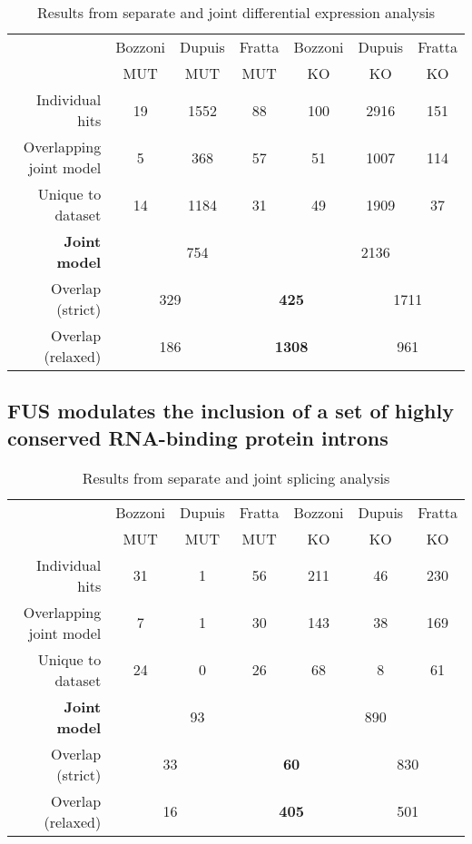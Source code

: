 \begin{table}[h!]
		\begin{tabular}{|r|ccc|ccc|}
			\hline
			& Bozzoni & Dupuis & Fratta & Bozzoni & Dupuis & Fratta\\
			& MUT & MUT & MUT & KO & KO & KO\\
			\hline
			Individual hits                & 19 & 1552 & 88 & 100 & 2916 & 151 \\
			Overlapping joint model & 5 & 368 & 57 & 51 & 1007 & 114 \\
			Unique to dataset          & 14 & 1184 & 31 & 49 & 1909 & 37 \\
			\hline
			\textbf{Joint model}       & \multicolumn{3}{c|}{754} & \multicolumn{3}{c|}{2136} \\
			\hline
			Overlap (strict)              & \multicolumn{2}{c}{329} & \multicolumn{2}{|c|}{\textbf{425}} & \multicolumn{2}{c|}{1711} \\
			Overlap (relaxed)           & \multicolumn{2}{c}{186} & \multicolumn{2}{|c|}{\textbf{1308} } & \multicolumn{2}{c|}{961} \\
			\hline
		\end{tabular}
	\caption{Results from separate and joint differential expression analysis}
	\label{tab:expression_results}
\end{table}




\subsection{FUS modulates the inclusion of a set of highly conserved RNA-binding protein introns}

\begin{table}[h!]
		\begin{tabular}{|r|ccc|ccc|}
			\hline
			& Bozzoni & Dupuis & Fratta & Bozzoni & Dupuis & Fratta\\
			& MUT & MUT & MUT & KO & KO & KO\\
			\hline
			Individual hits                & 31 & 1 & 56 & 211 & 46 & 230 \\
			Overlapping joint model & 7 & 1 & 30 & 143 & 38 & 169 \\
			Unique to dataset          & 24 & 0 & 26 & 68 & 8 & 61 \\
			\hline
			\textbf{Joint model}       & \multicolumn{3}{c|}{93} & \multicolumn{3}{c|}{890} \\
			\hline
			Overlap (strict)              & \multicolumn{2}{c}{33} & \multicolumn{2}{|c|}{\textbf{60}} & \multicolumn{2}{c|}{830} \\
			Overlap (relaxed)           & \multicolumn{2}{c}{16} & \multicolumn{2}{|c|}{\textbf{405} } & \multicolumn{2}{c|}{501} \\
			\hline
		\end{tabular}
	\caption{Results from separate and joint splicing analysis}
	\label{tab:splicing_results}
\end{table}

